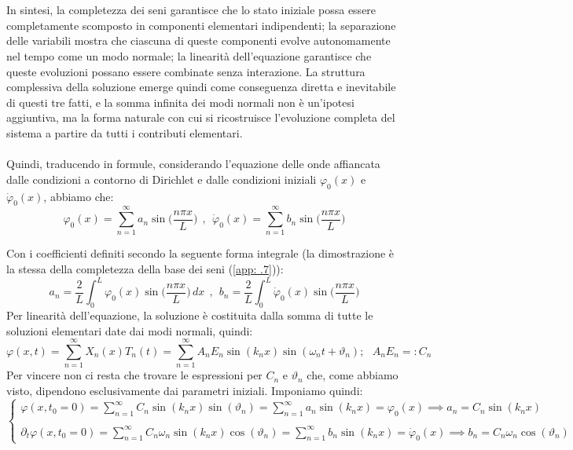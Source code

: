 \documentclass[a4paper,12pt]{report}
\begin{document}
\\
\\In sintesi, la completezza dei seni garantisce che lo stato iniziale possa essere completamente scomposto in componenti elementari indipendenti; la separazione delle variabili mostra che ciascuna di queste componenti evolve autonomamente nel tempo come un modo normale; la linearità dell’equazione garantisce che queste evoluzioni possano essere combinate senza interazione. La struttura complessiva della soluzione emerge quindi come conseguenza diretta e inevitabile di questi tre fatti, e la somma infinita dei modi normali non è un’ipotesi aggiuntiva, ma la forma naturale con cui si ricostruisce l’evoluzione completa del sistema a partire da tutti i contributi elementari.
\\
\\ Quindi, traducendo in formule, considerando l'equazione delle onde affiancata dalle condizioni a contorno di Dirichlet e dalle condizioni iniziali $\varphi_0(x)$ e $\dot{\varphi}_0(x)$, abbiamo che: 
\[\varphi_0(x)=\sum_{n=1}^\infty a_n\sin\bigg(\frac{n\pi x}{L}\bigg)\ \ ,\ \ \dot{\varphi}_0(x)=\sum_{n=1}^\infty b_n\sin\bigg(\frac{n\pi x}{L}\bigg)\]

\newpage

Con i coefficienti definiti secondo la seguente forma integrale (la dimostrazione è la stessa della completezza della base dei seni (\ref{app: .7})):
\[a_n=\frac{2}{L}\int_0^L\varphi_0(x)\sin\bigg(\frac{n\pi x}{L}\bigg)\,dx\ \ ,\ \ b_n=\frac{2}{L}\int_0^L\dot\varphi_0(x)\sin\bigg(\frac{n\pi x}{L}\bigg)\]
Per linearità dell'equazione, la soluzione è costituita dalla somma di tutte le soluzioni elementari date dai modi normali, quindi: 
\[\varphi(x,t)=\sum_{n=1}^\infty X_n(x)T_n(t)=\sum_{n=1}^\infty A_nE_n\sin(k_nx)\sin(\omega_nt+\vartheta_n); \ \ \ A_nE_n=:C_n\]
Per vincere non ci resta che trovare le espressioni per $C_n$ e $\vartheta_n$ che, come abbiamo visto, dipendono esclusivamente dai parametri iniziali. Imponiamo quindi:
\[\begin{cases}
    \varphi(x,t_0=0)=\sum_{n=1}^\infty C_n\sin(k_nx)\sin(\vartheta_n)=\sum_{n=1}^\infty a_n\sin(k_nx)=\varphi_0(x)\implies a_n=C_n\sin(k_nx)
    \\
    \\\partial_t\varphi(x,t_0=0)=\sum_{n=1}^\infty C_n\omega_n\sin(k_nx)\cos(\vartheta_n)=\sum_{n=1}^\infty b_n\sin(k_nx)=\dot{\varphi}_0(x)\implies b_n=C_n\omega_n\cos(\vartheta_n)
\end{cases}\]
\end{document}
